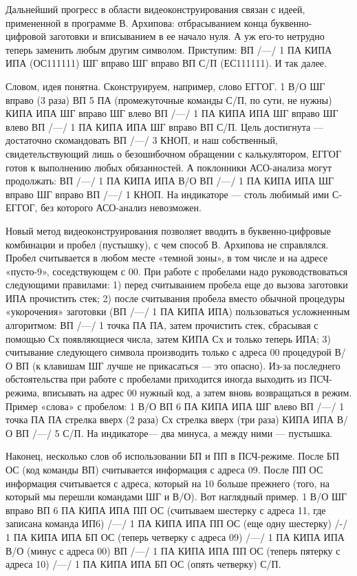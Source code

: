 \documentclass[11pt,a4paper,oneside]{article}
\begin{document}
Дальнейший прогресс в области видеоконструирования связан с идеей, примененной в программе В. Архипова: отбрасыванием конца буквенно-цифровой заготовки и вписыванием в ее начало нуля. А уж его-то нетрудно теперь заменить любым другим символом. Приступим: ВП /—/ 1 ПА КИПА ИПА (ОС111111) ШГ вправо ШГ вправо ВП С/П (ЕС111111). И так далее.

Словом, идея понятна. Сконструируем, например, слово ЕГГОГ. 1 В/О ШГ вправо (3 раза) ВП 5 ПА (промежуточные команды С/П, по сути, не нужны) КИПА ИПА ШГ вправо ШГ влево ВП /—/ 1 ПА КИПА ИПА ШГ вправо ШГ влево ВП /—/ 1 ПА КИПА ИПА ШГ вправо ВП С/П. Цель достигнута — достаточно скомандовать ВП /—/ 3 КНОП, и наш собственный, свидетельствующий лишь о безошибочном обращении с калькулятором, ЕГГОГ готов к выполнению любых обязанностей. А поклонники АСО-анализа могут продолжать: ВП /—/ 1 ПА КИПА ИПА В/О ВП /—/ 1 ПА КИПА ИПА ШГ вправо ШГ вправо ВП /—/ 1 КНОП. На индикаторе — столь любимый ими С-ЕГГОГ, без которого АСО-анализ невозможен.

Новый метод видеоконструирования позволяет вводить в буквенно-цифровые комбинации и пробел (пустышку), с чем способ В. Архипова не справлялся. Пробел считывается в любом месте «темной зоны», в том числе и на адресе «пусто-9», соседствующем с 00. При работе с пробелами надо руководствоваться следующими правилами: 1) перед считыванием пробела еще до вызова заготовки ИПА прочистить стек; 2) после считывания пробела вместо обычной процедуры «укорочения» заготовки (ВП /—/ 1 ПА КИПА ИПА) пользоваться усложненным алгоритмом: ВП /—/ 1 точка ПА ПА, затем прочистить стек, сбрасывая с помощью Сх появляющиеся числа, затем КИПА Сх и только теперь ИПА; 3) считывание следующего символа производить только с адреса 00 процедурой В/О ВП (к клавишам ШГ лучше не прикасаться — это опасно). Из-за последнего обстоятельства при работе с пробелами приходится иногда выходить из ПСЧ-режима, вписывать на адрес 00 нужный код, а затем вновь возвращаться в режим.
Пример «слова» с пробелом: 1 В/О ВП 6 ПА КИПА ИПА ШГ влево ВП /—/ 1 точка ПА ПА стрелка вверх (2 раза) Сх стрелка вверх (три раза) КИПА ИПА В/О ВП /—/ 5 С/П. На индикаторе— два минуса, а между ними — пустышка.

Наконец, несколько слов об использовании БП и ПП в ПСЧ-режиме. После БП ОС (код команды ВП) считывается информация с адреса 09. После ПП ОС информация считывается с адреса, который на 10 больше прежнего (того, на который мы перешли командами ШГ и В/О). Вот наглядный пример. 1 В/О ШГ вправо ВП 6 ПА КИПА ИПА ПП ОС (считываем шестерку с адреса 11, где записана команда ИП6) /—/ 1 ПА КИПА ИПА ПП ОС (еще одну шестерку) /-/ 1 ПА КИПА ИПА БП ОС (теперь четверку с адреса 09) /—/ 1 ПА КИПА ИПА В/О (минус с адреса 00) ВП /—/ 1 ПА КИПА ИПА ПП ОС (теперь пятерку с адреса 10) /—/ 1 ПА КИПА ИПА БП ОС (опять четверку) С/П.
\end{document}
